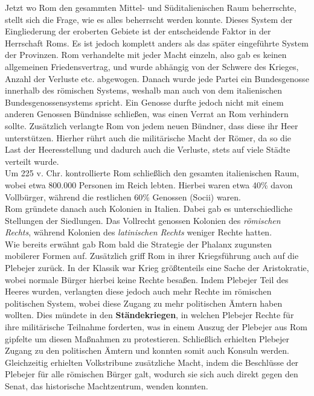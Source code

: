 \documentclass{article}
\begin{document}
	Jetzt wo Rom den gesammten Mittel- und Süditalienischen Raum beherrschte, stellt sich die Frage, wie es alles beherrscht werden konnte. Dieses System der Eingliederung der eroberten Gebiete ist der entscheidende Faktor in der Herrschaft Roms. Es ist jedoch komplett anders als das später eingeführte System der Provinzen. Rom verhandelte mit jeder Macht einzeln, also gab es keinen allgemeinen Friedensvertrag, und wurde abhängig von der Schwere des Krieges, Anzahl der Verluste etc. abgewogen. Danach wurde jede Partei ein Bundesgenosse innerhalb des römischen Systems, weshalb man auch von dem italienischen Bundesgenossensystems spricht. Ein Genosse durfte jedoch nicht mit einem anderen Genossen Bündnisse schließen, was einen Verrat an Rom verhindern sollte. Zusätzlich verlangte Rom von jedem neuen Bündner, dass diese ihr Heer unterstützen. Hierher rührt auch die militärische Macht der Römer, da so die Last der Heeresstellung und dadurch auch die Verluste, stets auf viele Städte verteilt wurde. \\
	Um 225 v. Chr. kontrollierte Rom schließlich den gesamten italienischen Raum, wobei etwa 800.000 Personen im Reich lebten. Hierbei waren etwa 40\% davon Vollbürger, während die restlichen 60\% Genossen (Socii) waren. \\
	Rom gründete danach auch Kolonien in Italien. Dabei gab es unterschiedliche Stellungen der Siedlungen. Das Vollrecht genossen Kolonien des \textit{römischen Rechts}, während Kolonien des \textit{latinischen Rechts} weniger Rechte hatten. \\
	Wie bereits erwähnt gab Rom bald die Strategie der Phalanx zugunsten mobilerer Formen auf. Zusätzlich griff Rom in ihrer Kriegsführung auch auf die Plebejer zurück. In der Klassik war Krieg größtenteils eine Sache der Aristokratie, wobei normale Bürger hierbei keine Rechte besaßen. Indem Plebejer Teil des Heeres wurden, verlangten diese jedoch auch mehr Rechte im römischen politischen System, wobei diese Zugang zu mehr politischen Ämtern haben wollten. Dies mündete in den \textbf{Ständekriegen}, in welchen Plebejer Rechte für ihre militärische Teilnahme forderten, was in einem Auszug der Plebejer aus Rom gipfelte um diesen Maßnahmen zu protestieren. Schließlich erhielten Plebejer Zugang zu den politischen Ämtern und konnten somit auch Konsuln werden. Gleichzeitig erhielten Volkstribune zusätzliche Macht, indem die Beschlüsse der Plebejer für alle römischen Bürger galt, wodurch sie sich auch direkt gegen den Senat, das historische Machtzentrum, wenden konnten. \\
\end{document}
